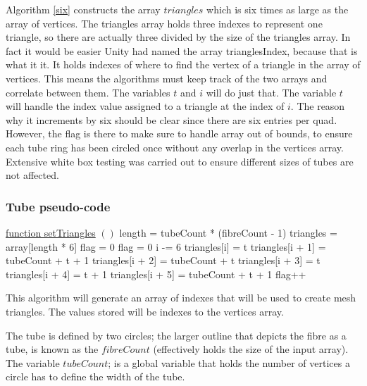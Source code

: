 \documentclass[12pt]{article} %
\begin{document}
\begin{flushleft}
Algorithm \ref{six} constructs the array $triangles$ which is six times as large as the array of vertices. The triangles array holds three indexes to represent one triangle, so there are actually three divided by the size of the triangles array. In fact it would be easier Unity had named the array trianglesIndex, because that is what it it. It holds indexes of where to find the vertex of a triangle in the array of vertices. This means the algorithms must keep track of the two arrays and correlate between them. The variables $t$ and $i$ will do just that. The variable $t$ will handle the index value assigned to a triangle at the index of $i$. The reason why it increments by six should be clear since there are six entries per quad. However, the flag is there to make sure to handle array out of bounds, to ensure each tube ring has been circled once without any overlap in the vertices array. Extensive white box testing was carried out to ensure different sizes of tubes are not affected.
\subsubsection{Tube pseudo-code} %
\begin{algorithm}[H]\label{six}

    \underline{function setTriangles} $()$\;
        length = tubeCount * (fibreCount - 1)\;
        triangles = array[length * 6]\;
        flag = 0\;
        {
            {
                flag = 0\;
                i -= 6\;
            }
            {
                triangles[i] = t\;
                triangles[i + 1] = tubeCount + t + 1\;
                triangles[i + 2] = tubeCount + t\;
                triangles[i + 3] = t\;
                triangles[i + 4] = t + 1\;
                triangles[i + 5] = tubeCount + t + 1\;
                flag++\;
            }
        }
    \caption{This algorithm will generate an array of indexes that will be used to create mesh triangles. The values stored will be indexes to the vertices array.}
\end{algorithm}
\newpage
The tube is defined by two circles; the larger outline that depicts the fibre as a tube, is known as the $fibreCount$ (effectively holds the size of the input array).
The variable $tubeCount$; is a global variable that holds the number of vertices a circle has to define the width of the tube.


\end{flushleft}
\end{document}
